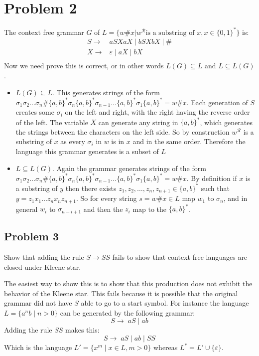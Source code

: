 \documentclass[english]{article}
\begin{document}
\section*{Problem 2}
The context free grammar $G$ of $L = \{ w\#x | w^\mathcal{R} \textrm{is a substring of }x, x \in \{0,1\}^* \}$ is:
\begin{align*}
S \rightarrow & aSXaX \; | \; bSXbX \; | \; \# \\
X \rightarrow & \varepsilon \; | \; aX \; | \; bX \\
\end{align*}
Now we need prove this is correct, or in other words $L(G) \subseteq L$ and $L \subseteq L(G)$.
\begin{itemize}
\item $L(G) \subseteq L$. This generates strings of the form
      $\sigma_1 \sigma_2 \ldots \sigma_n \# \{a,b\}^* \sigma_n \{a,b\}^* \sigma_{n-1} \ldots \{a,b\}^* \sigma_1 \{a,b\}^* = w\#x$.
      Each generation of $S$ creates some $\sigma_i$ on the left and right, with the right having the reverse order of the left.
      The variable $X$ can generate any string in $\{a,b\}^*$, which generates the strings between the characters on the left side.
      So by construction $w^\mathcal{R}$ is a substring of $x$ as every $\sigma_i$ in $w$ is in $x$ and in the same order. Therefore
      the language this grammar generates is a subset of $L$
\item $L \subseteq L(G)$. Again the grammar generates strings of the form 
      $\sigma_1 \sigma_2 \ldots \sigma_n \# \{a,b\}^* \sigma_n \{a,b\}^* \sigma_{n-1} \ldots \{a,b\}^* \sigma_1 \{a,b\}^* = w\#x$.
      By definition if $x$ is a substring of $y$ then there exists $z_1, z_2, \ldots, z_n, z_{n+1} \in \{a,b\}^*$ such that 
      $y = z_1 x_1 \ldots z_n x_n z_{n+1}$. So for every string $s = w\#x \in L$ map $w_1$ to $\sigma_n$, and in general $w_i$ to
      $\sigma_{n-i+1}$ and then the $z_i$ map to the $\{a,b\}^*$. 
\end{itemize}


\subsection*{Problem 3}
Show that adding the rule \(S \rightarrow SS\) fails to show that context free languages are closed under Kleene star.

The easiest way to show this is to show that this production does not exhibit the behavior of the Kleene star. This fails because it is possible that the original grammar did not have $S$ able to go to a start symbol. For instance
the language \(L = \{ a^n b \mid n > 0 \}\) can be generated by the following grammar:
\[ S \rightarrow \; aS \; | \; ab \]
Adding the rule $SS$ makes this:
\[ S \rightarrow \; aS \; | \; ab \; | \; SS \]
Which is the language \(L' = \{ x^m \mid x \in L, m > 0 \}\) whereas \(L^* = L' \cup \{\varepsilon\}\).
\end{document}
